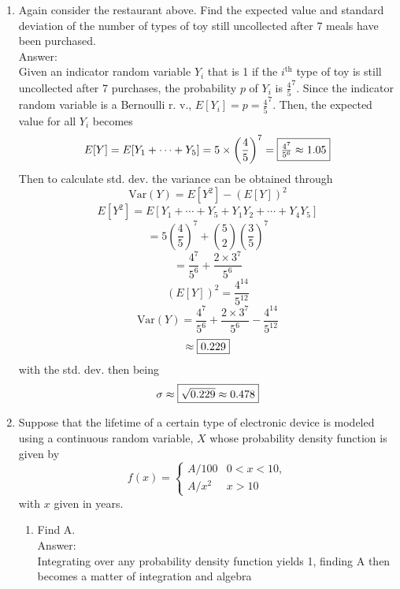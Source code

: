 \documentclass{article}
\begin{document}
\begin{enumerate}
            \clearpage
            \item   Again consider the restaurant above. Find the expected value and standard deviation of the number 
                    of types of toy still uncollected after 7 meals have been purchased.
                    \\Answer:\\
                    Given an indicator random variable $Y_i$ that is 1 if the $i^{\text{th}}$ type of toy is still 
                    uncollected after 7 purchases, the probability $p$ of $Y_i$ is $\frac{4}{5}^7$. Since the indicator
                    random variable is a Bernoulli r. v., $E[Y_i]=p=\frac{4}{5}^7$.
                    Then, the expected value for all $Y_i$ becomes
                    $$ E[Y] = E[Y_1 + \cdots + Y_5] = 5 \times \left(\frac{4}{5}\right)^7=\fbox{$\frac{4^7}{5^6}\approx1.05$} $$
                    Then to calculate std. dev. the variance can be obtained through
                    $$ \text{Var}(Y) = E[Y^2] - (E[Y])^2 $$
                    $$ E[Y^2] = E[Y_1 + \cdots + Y_5 + Y_1Y_2 + \cdots + Y_4Y_5] $$
                    $$ = 5\left(\frac{4}{5}\right)^7 + \binom{5}{2}\left(\frac{3}{5}\right)^7 $$
                    $$ = \frac{4^7}{5^6} + \frac{2\times3^7}{5^6} $$
                    $$ \left(E[Y]\right)^2 = \frac{4^{14}}{5^{12}} $$
                    $$ \text{Var}(Y) = \frac{4^7}{5^6} + \frac{2\times3^7}{5^6} - \frac{4^{14}}{5^{12}} $$
                    $$ \approx \fbox{0.229}$$
                    with the std. dev. then being
                    $$ \sigma \approx \fbox{$ \sqrt{0.229} \approx 0.478 $}$$
            \clearpage
            \item   Suppose that the lifetime of a certain type of electronic device is modeled using a continuous random 
                    variable, $X$ whose probability density function is given by 
                    $$ f(x) = \begin{cases} A/100 & 0<x<10, \\ A/x^2 & x > 10 \end{cases}$$
                    with $x$ given in years.
                    \begin{enumerate}
                        \item   Find A.
                                \\Answer:\\
                                Integrating over any probability density function yields 1, finding A then becomes a matter 
                                of integration and algebra

\end{enumerate}
\end{enumerate}
\end{document}
